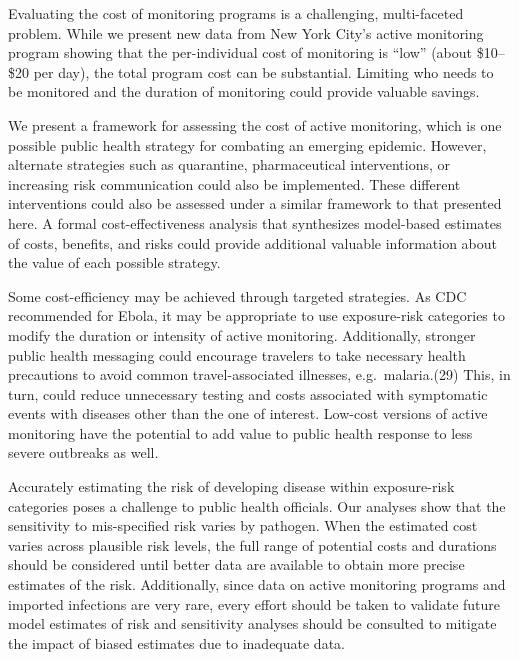 \documentclass[]{article}
\begin{document}
Evaluating the cost of monitoring programs is a challenging,
multi-faceted problem. While we present new data from New York City's
active monitoring program showing that the per-individual cost of
monitoring is ``low'' (about \$10--\$20 per day), the total program cost
can be substantial. Limiting who needs to be monitored and the duration
of monitoring could provide valuable savings.

We present a framework for assessing the cost of active monitoring,
which is one possible public health strategy for combating an emerging
epidemic. However, alternate strategies such as quarantine,
pharmaceutical interventions, or increasing risk communication could
also be implemented. These different interventions could also be
assessed under a similar framework to that presented here. A formal
cost-effectiveness analysis that synthesizes model-based estimates of
costs, benefits, and risks could provide additional valuable information
about the value of each possible strategy.

Some cost-efficiency may be achieved through targeted strategies. As CDC
recommended for Ebola, it may be appropriate to use exposure-risk
categories to modify the duration or intensity of active monitoring.
Additionally, stronger public health messaging could encourage travelers
to take necessary health precautions to avoid common travel-associated
illnesses, e.g.~malaria.(29) This, in turn, could reduce unnecessary
testing and costs associated with symptomatic events with diseases other
than the one of interest. Low-cost versions of active monitoring have
the potential to add value to public health response to less severe
outbreaks as well.

Accurately estimating the risk of developing disease within
exposure-risk categories poses a challenge to public health officials.
Our analyses show that the sensitivity to mis-specified risk varies by
pathogen. When the estimated cost varies across plausible risk levels,
the full range of potential costs and durations should be considered
until better data are available to obtain more precise estimates of the
risk. Additionally, since data on active monitoring programs and
imported infections are very rare, every effort should be taken to
validate future model estimates of risk and sensitivity analyses should
be consulted to mitigate the impact of biased estimates due to
inadequate data.
\end{document}
